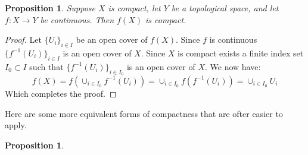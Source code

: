 \documentclass[11pt,a4paper]{article}
\theoremstyle{plain}
\newtheorem{proposition}[theorem]{Proposition}
\begin{document}
	\begin{proposition}
		Suppose $X$ is compact, let $Y$ be a topological space, and let
		$f \colon X \to Y$ be continuous. Then $f(X)$ is compact.
	\end{proposition}
	\begin{proof}
		Let $\{U_i\}_{i \in I}$ be an open cover of $f(X)$. Since $f$
		is continuous $\{f^{-1}(U_i)\}_{i \in I}$ is an open cover of $X$.
		Since $X$ is compact exists a finite index set $I_0 \subset I$
		such that $\{f^{-1}(U_i)\}_{i \in I_0}$ is an open cover of $X$.
		We now have:
		\[
			f(X) = f(\cup_{i \in I_0} f^{-1}(U_i)) = 
			\cup_{i \in I_0} f(f^{-1}(U_i)) = 
			\cup_{i \in I_0} U_i
		\]
		Which completes the proof.
	\end{proof}
	Here are some more equivalent forms of compactness that are ofter easier
	to apply.
	\begin{proposition}
		
	\end{proposition}
	
	
	
\end{document}
